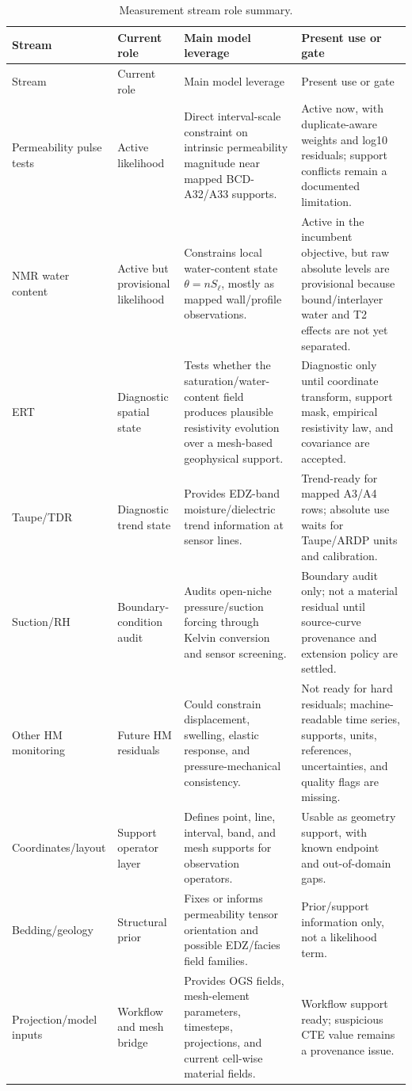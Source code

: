 \documentclass[10pt,a4paper]{article}
\newcommand{\npor}{n}
\newcommand{\Sat}{S_\ell}
\newcommand{\thetaw}{\theta}
\begin{document}
\begin{longtable}{@{}L{0.17\textwidth}L{0.17\textwidth}L{0.21\textwidth}Y@{}}
\caption{Measurement stream role summary.}\\
\toprule
Stream & Current role & Main model leverage & Present use or gate \\
\midrule
\endfirsthead
\toprule
Stream & Current role & Main model leverage & Present use or gate \\
\midrule
\endhead
\bottomrule
\endlastfoot
Permeability pulse tests & Active likelihood & Direct interval-scale constraint on intrinsic permeability magnitude near mapped BCD-A32/A33 supports. & Active now, with duplicate-aware weights and log10 residuals; support conflicts remain a documented limitation. \\
NMR water content & Active but provisional likelihood & Constrains local water-content state \(\thetaw=\npor\Sat\), mostly as mapped wall/profile observations. & Active in the incumbent objective, but raw absolute levels are provisional because bound/interlayer water and T2 effects are not yet separated. \\
ERT & Diagnostic spatial state & Tests whether the saturation/water-content field produces plausible resistivity evolution over a mesh-based geophysical support. & Diagnostic only until coordinate transform, support mask, empirical resistivity law, and covariance are accepted. \\
Taupe/TDR & Diagnostic trend state & Provides EDZ-band moisture/dielectric trend information at sensor lines. & Trend-ready for mapped A3/A4 rows; absolute use waits for Taupe/ARDP units and calibration. \\
Suction/RH & Boundary-condition audit & Audits open-niche pressure/suction forcing through Kelvin conversion and sensor screening. & Boundary audit only; not a material residual until source-curve provenance and extension policy are settled. \\
Other HM monitoring & Future HM residuals & Could constrain displacement, swelling, elastic response, and pressure-mechanical consistency. & Not ready for hard residuals; machine-readable time series, supports, units, references, uncertainties, and quality flags are missing. \\
Coordinates/layout & Support operator layer & Defines point, line, interval, band, and mesh supports for observation operators. & Usable as geometry support, with known endpoint and out-of-domain gaps. \\
Bedding/geology & Structural prior & Fixes or informs permeability tensor orientation and possible EDZ/facies field families. & Prior/support information only, not a likelihood term. \\
Projection/model inputs & Workflow and mesh bridge & Provides OGS fields, mesh-element parameters, timesteps, projections, and current cell-wise material fields. & Workflow support ready; suspicious CTE value remains a provenance issue. \\
\end{longtable}
\end{document}
